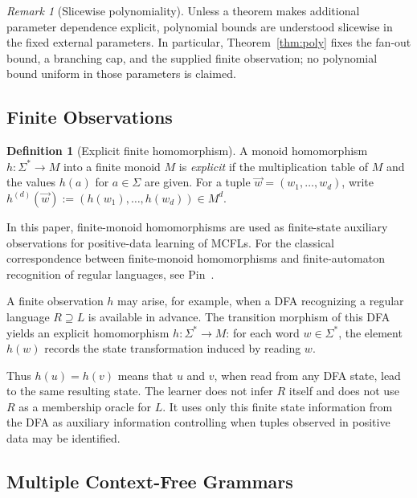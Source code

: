 \documentclass[11pt,a4paper]{article}
\numberwithin{equation}{section}
\theoremstyle{plain}
\theoremstyle{definition}
\newtheorem{definition}[theorem]{Definition}
\theoremstyle{remark}
\newtheorem{remark}[theorem]{Remark}
\newcommand{\tuple}[1]{\vec{#1}}
\begin{document}
\begin{remark}[Slicewise polynomiality]
\label{rem:slicewise-poly}
Unless a theorem makes additional parameter dependence explicit, polynomial
bounds are understood slicewise in the fixed external parameters.  In
particular, Theorem~\ref{thm:poly} fixes the fan-out bound, a branching cap,
and the supplied finite observation; no polynomial bound uniform in those
parameters is claimed.
\end{remark}

\subsection{Finite Observations}

\begin{definition}[Explicit finite homomorphism]
\label{def-monoid-morphism}
A monoid homomorphism \(h\colon\Sigma^*\to M\) into a finite monoid \(M\) is
\emph{explicit} if the multiplication table of \(M\) and the values \(h(a)\) for
\(a\in\Sigma\) are given.  For a tuple \(\tuple w=(w_1,\ldots,w_d)\), write
\(h^{(d)}(\tuple w):=(h(w_1),\ldots,h(w_d))\in M^d\).
\end{definition}

In this paper, finite-monoid homomorphisms are used as finite-state auxiliary
observations for positive-data learning of MCFLs.  For the classical
correspondence between finite-monoid homomorphisms and finite-automaton
recognition of regular languages, see Pin~\cite{Pin1986}.

A finite observation \(h\) may arise, for example, when a DFA recognizing a
regular language \(R\supseteq L\) is available in advance.  The transition
morphism of this DFA yields an explicit homomorphism \(h:\Sigma^*\to M\): for
each word \(w\in\Sigma^*\), the element \(h(w)\) records the state
transformation induced by reading \(w\).

Thus \(h(u)=h(v)\) means that \(u\) and \(v\), when read from any DFA state,
lead to the same resulting state.  The learner does not infer \(R\) itself and
does not use \(R\) as a membership oracle for \(L\).  It uses only this finite
state information from the DFA as auxiliary information controlling when
tuples observed in positive data may be identified.


\subsection{Multiple Context-Free Grammars}
\end{document}
